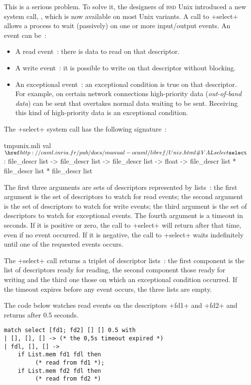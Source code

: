 This is a serious problem. To solve it, the designers of \textsc{bsd}
Unix introduced a new system call, , which is now
available on most Unix variants. A call to \ml+select+ allows a
process to wait (passively) on one or more input/output events.
An event can be~:
%
\begin{itemize}
\item A read event~: there is data to read on that descriptor.

\item A write event~: it is possible to write on that descriptor
  without blocking.

\item An exceptional event~: an exceptional condition is
  true on that descriptor. For example, on certain network connections
  high-priority data (\emph{out-of-band data}) can be sent that
  overtakes normal data waiting to be sent. Receiving this kind of 
  high-priority data is an exceptional condition.
\end{itemize}
%
The \ml+select+ system call has the following signature~:
%
\begin{listingcodefile}{tmpunix.mli}
val $\libvalue{Unix}{select}$ : 
    file_descr list -> file_descr list -> file_descr list -> 
      float -> file_descr list * file_descr list * file_descr list
\end{listingcodefile}
%
The first three arguments are sets of descriptors represented by
lists~: the first argument is the set of descriptors to watch for read
events; the second argument is the set of descriptors to watch for
write events; the third argument is the set of descriptors to watch
for exceptional events. The fourth argument is a timeout in
seconds. If it is positive or zero, the call to \ml+select+ will return
after that time, even if no event occurred. If it is negative, the call
to \ml+select+ waits indefinitely until one of the requested events occurs.

The \ml+select+ call returns a triplet of descriptor lists~: the first
component is the list of descriptors ready for reading, the second
component those ready for writing and the third one those on which an
exceptional condition occurred. If the timeout expires before any
event occurs, the three lists are empty.

\begin{example} 
The code below watches read events on the descriptors \ml+fd1+ and 
\ml+fd2+ and returns after 0.5 seconds. 
\begin{lstlisting}
match select [fd1; fd2] [] [] 0.5 with
| [], [], [] -> (* the 0,5s timeout expired *)
| fdl, [], [] ->
    if List.mem fd1 fdl then
         (* read from fd1 *);
    if List.mem fd2 fdl then
         (* read from fd2 *)
\end{lstlisting}
\end{example}

